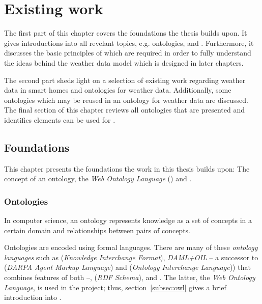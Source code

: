 \chapter{Existing work}
\label{ch:existing_work}

The first part of this chapter covers the foundations the thesis builds upon. It gives introductions into all revelant topics, e.g. ontologies,  and . Furthermore, it discusses the basic principles of \thinkhome which are required in order to fully understand the ideas behind the weather data model which is designed in later chapters.

The second part sheds light on a selection of existing work regarding weather data in smart homes and ontologies for weather data. Additionally, some ontologies which may be reused in an ontology for weather data are discussed. The final section of this chapter reviews all ontologies that are presented and identifies elements can be used for \thinkhome.

\section{Foundations}

This chapter presents the foundations the work in this thesis builds upon: The concept of an ontology, the \emph{Web Ontology Language} () and \thinkhome.

\subsection{Ontologies}

In computer science, an ontology represents knowledge as a set of concepts in a certain domain and relationships between pairs of concepts.


Ontologies are encoded using formal languages. There are many of these \emph{ontology languages} such as  (\emph{Knowledge Interchange Format}), \emph{DAML+OIL} -- a successor to  (\emph{DARPA Agent Markup Language}) and  (\emph{Ontology Interchange Language})) that combines features of both --,  (\emph{RDF Schema}), and . The latter, the \emph{Web Ontology Language}, is used in the \thinkhome project; thus, section~\ref{subsec:owl} gives a brief introduction into .

